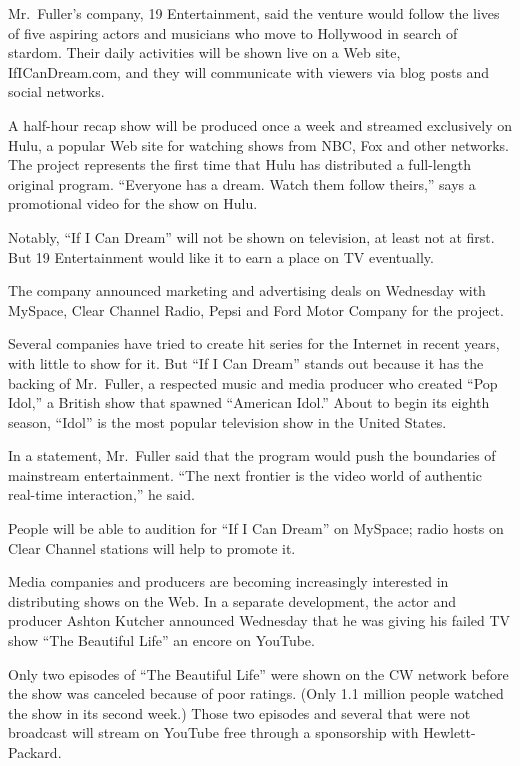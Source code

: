 ﻿\documentclass[12pt]{article}
\begin{document}
Mr.~Fuller's company, 19 Entertainment, said the venture would follow the lives of five aspiring
actors and musicians who move to Hollywood in search of stardom. Their daily activities will be
shown live on a Web site, IfICanDream.com, and they will communicate with viewers via blog posts and
social networks.

A half-hour recap show will be produced once a week and streamed exclusively on Hulu, a popular Web
site for watching shows from NBC, Fox and other networks. The project represents the first time that
Hulu has distributed a full-length original program. ``Everyone has a dream. Watch them follow
theirs,'' says a promotional video for the show on Hulu.

Notably, ``If I Can Dream'' will not be shown on television, at least not at first. But 19
Entertainment would like it to earn a place on TV eventually.

The company announced marketing and advertising deals on Wednesday with MySpace, Clear Channel
Radio, Pepsi and Ford Motor Company for the project.

Several companies have tried to create hit series for the Internet in recent years, with little to
show for it. But ``If I Can Dream'' stands out because it has the backing of Mr.~Fuller, a respected
music and media producer who created ``Pop Idol,'' a British show that spawned ``American Idol.''
About to begin its eighth season, ``Idol'' is the most popular television show in the United States.

In a statement, Mr.~Fuller said that the program would push the boundaries of mainstream
entertainment. ``The next frontier is the video world of authentic real-time interaction,'' he said.

People will be able to audition for ``If I Can Dream'' on MySpace; radio hosts on Clear Channel
stations will help to promote it.

Media companies and producers are becoming increasingly interested in distributing shows on the Web.
In a separate development, the actor and producer Ashton Kutcher announced Wednesday that he was
giving his failed TV show ``The Beautiful Life'' an encore on YouTube.

Only two episodes of ``The Beautiful Life'' were shown on the CW network before the show was
canceled because of poor ratings. (Only 1.1 million people watched the show in its second week.)
Those two episodes and several that were not broadcast will stream on YouTube free through a
sponsorship with Hewlett-Packard.
\end{document}
